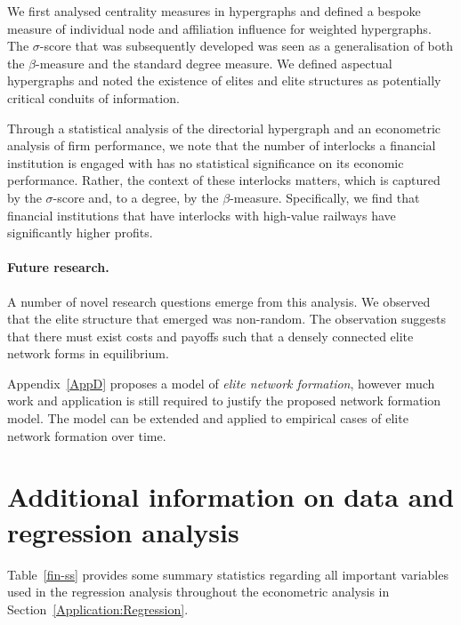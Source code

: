 \documentclass[11pt,fleqn]{article}
\begin{document}
We first analysed centrality measures in hypergraphs and defined a bespoke measure of individual node and affiliation influence for weighted hypergraphs. The $\sigma$-score that was subsequently developed was seen as a generalisation of both the $\beta$-measure and the standard degree measure. We defined aspectual hypergraphs and noted the existence of elites and elite structures as potentially critical conduits of information.

Through a statistical analysis of the directorial hypergraph and an econometric analysis of firm performance, we note that the number of interlocks a financial institution is engaged with has no statistical significance on its economic performance. Rather, the context of these interlocks matters, which is captured by the $\sigma$-score and, to a degree, by the $\beta$-measure. Specifically, we find that financial institutions that have interlocks with high-value railways have significantly higher profits.

\paragraph{Future research.}

A number of novel research questions emerge from this analysis. We observed that the elite structure that emerged was non-random. The observation suggests that there must exist costs and payoffs such that a densely connected elite network forms in equilibrium. 

Appendix~\ref{AppD} proposes a model of \emph{elite network formation}, however much work and application is still required to justify the proposed network formation model. The model can be extended and applied to empirical cases of elite network formation over time.

\newpage

\singlespace



\newpage

\appendix
\section[Additional information on data and regression analysis]{Additional information on data and regression analysis} \label{AppB}

Table~\ref{fin-ss} provides some summary statistics regarding all important variables used in the regression analysis throughout the econometric analysis in Section~\ref{Application:Regression}.
\end{document}
